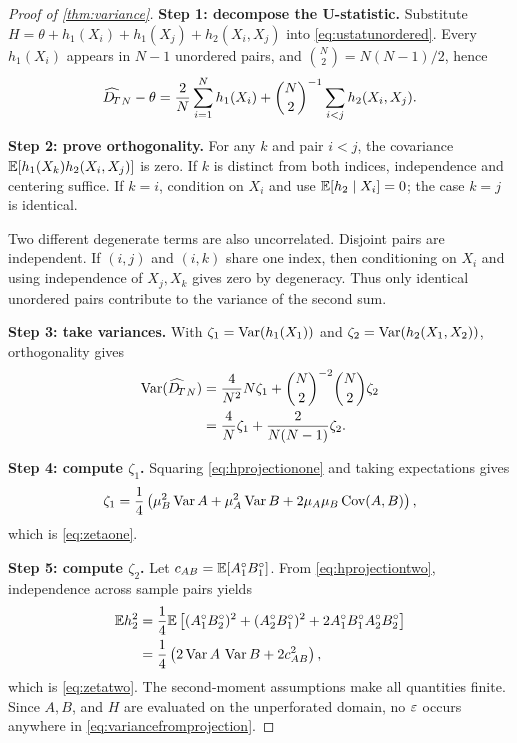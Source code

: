 \begin{proof}[Proof of \cref{thm:variance}]
\textbf{Step 1: decompose the U-statistic.}
Substitute
$H=\theta+h_1(X_i)+h_1(X_j)+h_2(X_i,X_j)$ into
\cref{eq:ustatunordered}.  Every $h_1(X_i)$ appears in $N-1$ unordered pairs,
and $\binom N2=N(N-1)/2$, hence
\begin{equation}
 \widehat{D_{\!T}}_N-\theta
 =\frac2N\sum_{i=1}^Nh_1(X_i)
 +\binom N2^{-1}\sum_{i<j}h_2(X_i,X_j).
 \label{eq:hoeffdingdecomposition}
\end{equation}

\textbf{Step 2: prove orthogonality.}
For any $k$ and pair $i<j$, the covariance
$\mathbb{E}[h_1(X_k)h_2(X_i,X_j)]$ is zero.  If $k$ is distinct from both indices,
independence and centering suffice.  If $k=i$, condition on $X_i$ and use
$\mathbb{E}[h_2\mid X_i]=0$; the case $k=j$ is identical.

Two different degenerate terms are also uncorrelated.  Disjoint pairs are
independent.  If $(i,j)$ and $(i,k)$ share one index, then conditioning on
$X_i$ and using independence of $X_j,X_k$ gives zero by degeneracy.  Thus only
identical unordered pairs contribute to the variance of the second sum.

\textbf{Step 3: take variances.}
With $\zeta_1=\operatorname{Var}(h_1(X_1))$ and
$\zeta_2=\operatorname{Var}(h_2(X_1,X_2))$, orthogonality gives
\begin{align}
 \operatorname{Var}(\widehat{D_{\!T}}_N)
 &=\frac{4}{N^2}N\zeta_1
 +\binom N2^{-2}\binom N2\zeta_2\\
 &=\frac4N\zeta_1+\frac{2}{N(N-1)}\zeta_2.
 \label{eq:variancefromprojection}
\end{align}

\textbf{Step 4: compute $\zeta_1$.}
Squaring \cref{eq:hprojectionone} and taking expectations gives
\begin{equation}
 \zeta_1=\frac14\left(
 \mu_B^2\operatorname{Var} A+\mu_A^2\operatorname{Var} B
 +2\mu_A\mu_B\operatorname{Cov}(A,B)\right),
\end{equation}
which is \cref{eq:zetaone}.

\textbf{Step 5: compute $\zeta_2$.}
Let $c_{AB}=\mathbb{E}[A_1^\circ B_1^\circ]$.  From
\cref{eq:hprojectiontwo}, independence across sample pairs yields
\begin{align}
 \mathbb{E} h_2^2
 &=\frac14\mathbb{E}\left[
 (A_1^\circ B_2^\circ)^2+(A_2^\circ B_1^\circ)^2
 +2A_1^\circ B_1^\circ A_2^\circ B_2^\circ\right]\\
 &=\frac14\left(2\operatorname{Var} A\,\operatorname{Var} B+2c_{AB}^2\right),
\end{align}
which is \cref{eq:zetatwo}.  The second-moment assumptions make all quantities
finite.  Since $A,B$, and $H$ are evaluated on the unperforated domain, no
$\varepsilon$ occurs anywhere in \cref{eq:variancefromprojection}.
\end{proof}

